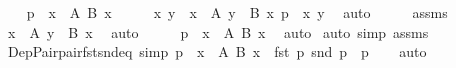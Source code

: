 \begin{isabellebody}
%
\isadelimproof
%
\endisadelimproof
%
\isatagproof
{}\isamarkupfalse%
\isanewline
\ \ \isamarkupfalse%
\ {\isachardoublequoteopen}p\ {\isacharcolon}{\kern0pt}\ {\isasymSum}x\ {\isacharcolon}{\kern0pt}\ A{\isacharprime}{\kern0pt}{\isachardot}{\kern0pt}\ {\isacharparenleft}{\kern0pt}B{\isacharprime}{\kern0pt}\ x{\isacharparenright}{\kern0pt}{\isachardoublequoteclose}\isanewline
\ \ \isamarkupfalse%
\ \isamarkupfalse%
\ x\ y\ \ {\isachardoublequoteopen}x\ {\isacharcolon}{\kern0pt}\ A{\isacharprime}{\kern0pt}{\isachardoublequoteclose}\ {\isachardoublequoteopen}y\ {\isacharcolon}{\kern0pt}\ B{\isacharprime}{\kern0pt}\ x{\isachardoublequoteclose}\ {\isachardoublequoteopen}p\ {\isacharequal}{\kern0pt}\ {\isasymlangle}x{\isacharcomma}{\kern0pt}\ y{\isasymrangle}{\isachardoublequoteclose}\ \isamarkupfalse%
\ auto\isanewline
\ \ \isamarkupfalse%
\ \isamarkupfalse%
\ assms\ \isamarkupfalse%
\ {\isachardoublequoteopen}x\ {\isacharcolon}{\kern0pt}\ A{\isachardoublequoteclose}\ {\isachardoublequoteopen}y\ {\isacharcolon}{\kern0pt}\ B\ x{\isachardoublequoteclose}\ \isamarkupfalse%
\ auto\isanewline
\ \ \isamarkupfalse%
\ \isamarkupfalse%
\ {\isachardoublequoteopen}p\ {\isacharcolon}{\kern0pt}\ {\isasymSum}x\ {\isacharcolon}{\kern0pt}\ A{\isachardot}{\kern0pt}\ {\isacharparenleft}{\kern0pt}B\ x{\isacharparenright}{\kern0pt}{\isachardoublequoteclose}\ \isamarkupfalse%
\ auto\isanewline
{}\isamarkupfalse%
\ {\isacharparenleft}{\kern0pt}auto\ simp{\isacharcolon}{\kern0pt}\ assms{\isacharparenright}{\kern0pt}%
\endisatagproof
{\isafoldproof}%
%
\isadelimproof
\isanewline
%
\endisadelimproof
\isanewline
{}\isamarkupfalse%
\ Dep{\isacharunderscore}{\kern0pt}Pair{\isacharunderscore}{\kern0pt}pair{\isacharunderscore}{\kern0pt}fst{\isacharunderscore}{\kern0pt}snd{\isacharunderscore}{\kern0pt}eq\ {\isacharbrackleft}{\kern0pt}simp{\isacharbrackright}{\kern0pt}{\isacharcolon}{\kern0pt}\ {\isachardoublequoteopen}p\ {\isacharcolon}{\kern0pt}\ {\isasymSum}x\ {\isacharcolon}{\kern0pt}\ A{\isachardot}{\kern0pt}\ {\isacharparenleft}{\kern0pt}B\ x{\isacharparenright}{\kern0pt}\ {\isasymLongrightarrow}\ {\isasymlangle}fst\ p{\isacharcomma}{\kern0pt}\ snd\ p{\isasymrangle}\ {\isacharequal}{\kern0pt}\ p{\isachardoublequoteclose}\isanewline
%
\isadelimproof
\ \ %
\endisadelimproof
%
\isatagproof
{}\isamarkupfalse%
\ auto%
\endisatagproof

\end{isabellebody}

